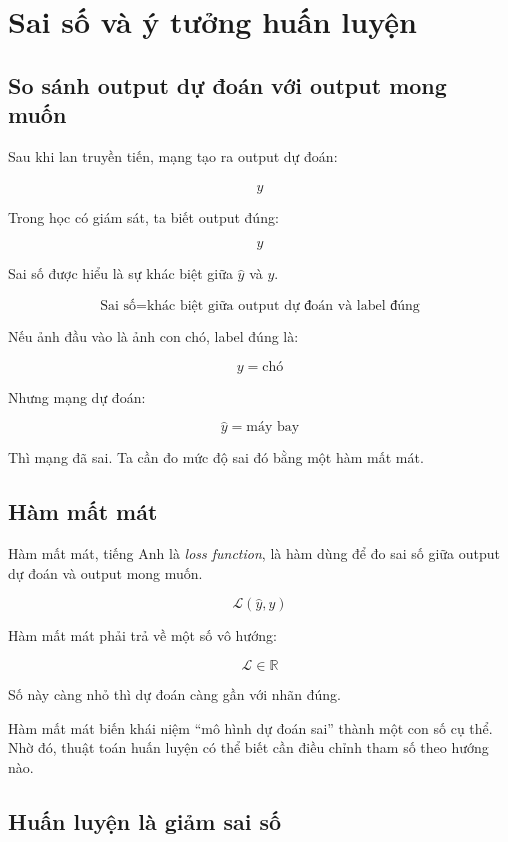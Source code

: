 \documentclass[12pt,a4paper]{report}
\begin{document}
\chapter{Sai số và ý tưởng huấn luyện}

\section{So sánh output dự đoán với output mong muốn}

Sau khi lan truyền tiến, mạng tạo ra output dự đoán:

\[
    \hat{y}
\]

Trong học có giám sát, ta biết output đúng:

\[
    y
\]

Sai số được hiểu là sự khác biệt giữa $\hat{y}$ và $y$.

\[
    \text{Sai số} = \text{khác biệt giữa output dự đoán và label đúng}
\]

\begin{vidu}
Nếu ảnh đầu vào là ảnh con chó, label đúng là:

\[
    y = \text{chó}
\]

Nhưng mạng dự đoán:

\[
    \hat{y} = \text{máy bay}
\]

Thì mạng đã sai. Ta cần đo mức độ sai đó bằng một hàm mất mát.
\end{vidu}

\section{Hàm mất mát}

Hàm mất mát, tiếng Anh là \textit{loss function}, là hàm dùng để đo sai số giữa output dự đoán và output mong muốn.

\[
    \mathcal{L}(\hat{y},y)
\]

Hàm mất mát phải trả về một số vô hướng:

\[
    \mathcal{L} \in \mathbb{R}
\]

Số này càng nhỏ thì dự đoán càng gần với nhãn đúng.

\begin{ghinho}
Hàm mất mát biến khái niệm ``mô hình dự đoán sai'' thành một con số cụ thể. Nhờ đó, thuật toán huấn luyện có thể biết cần điều chỉnh tham số theo hướng nào.
\end{ghinho}

\section{Huấn luyện là giảm sai số}
\end{document}
